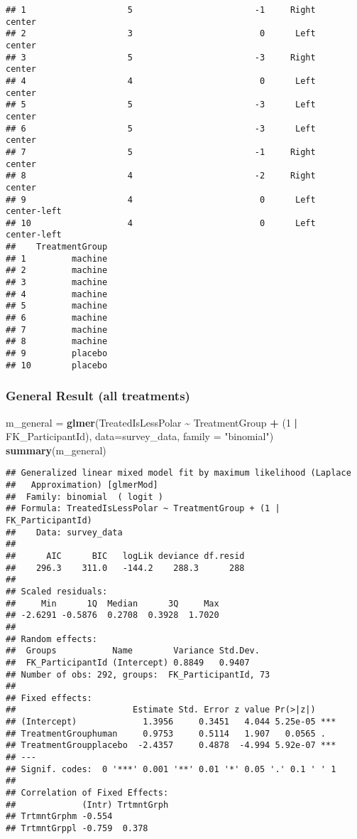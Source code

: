 \documentclass[
]{article}
\newenvironment{Shaded}{\begin{snugshade}}{\end{snugshade}}
\newcommand{\AttributeTok}[1]{\textcolor[rgb]{0.13,0.29,0.53}{#1}}
\newcommand{\DecValTok}[1]{\textcolor[rgb]{0.00,0.00,0.81}{#1}}
\newcommand{\FunctionTok}[1]{\textcolor[rgb]{0.13,0.29,0.53}{\textbf{#1}}}
\newcommand{\NormalTok}[1]{#1}
\newcommand{\OtherTok}[1]{\textcolor[rgb]{0.56,0.35,0.01}{#1}}
\newcommand{\SpecialCharTok}[1]{\textcolor[rgb]{0.81,0.36,0.00}{\textbf{#1}}}
\newcommand{\StringTok}[1]{\textcolor[rgb]{0.31,0.60,0.02}{#1}}
\begin{document}
\begin{verbatim}
## 1                    5                        -1     Right             center
## 2                    3                         0      Left             center
## 3                    5                        -3     Right             center
## 4                    4                         0      Left             center
## 5                    5                        -3      Left             center
## 6                    5                        -3      Left             center
## 7                    5                        -1     Right             center
## 8                    4                        -2     Right             center
## 9                    4                         0      Left        center-left
## 10                   4                         0      Left        center-left
##    TreatmentGroup
## 1         machine
## 2         machine
## 3         machine
## 4         machine
## 5         machine
## 6         machine
## 7         machine
## 8         machine
## 9         placebo
## 10        placebo
\end{verbatim}

\subsubsection{General Result (all
treatments)}\label{general-result-all-treatments}

\begin{Shaded}
\begin{Highlighting}[]
\NormalTok{m\_general }\OtherTok{=} \FunctionTok{glmer}\NormalTok{(TreatedIsLessPolar }\SpecialCharTok{\textasciitilde{}}\NormalTok{ TreatmentGroup }\SpecialCharTok{+}\NormalTok{ (}\DecValTok{1} \SpecialCharTok{|}\NormalTok{ FK\_ParticipantId),}
              \AttributeTok{data=}\NormalTok{survey\_data, }\AttributeTok{family =} \StringTok{"binomial"}\NormalTok{)}
\FunctionTok{summary}\NormalTok{(m\_general)}
\end{Highlighting}
\end{Shaded}

\begin{verbatim}
## Generalized linear mixed model fit by maximum likelihood (Laplace
##   Approximation) [glmerMod]
##  Family: binomial  ( logit )
## Formula: TreatedIsLessPolar ~ TreatmentGroup + (1 | FK_ParticipantId)
##    Data: survey_data
## 
##      AIC      BIC   logLik deviance df.resid 
##    296.3    311.0   -144.2    288.3      288 
## 
## Scaled residuals: 
##     Min      1Q  Median      3Q     Max 
## -2.6291 -0.5876  0.2708  0.3928  1.7020 
## 
## Random effects:
##  Groups           Name        Variance Std.Dev.
##  FK_ParticipantId (Intercept) 0.8849   0.9407  
## Number of obs: 292, groups:  FK_ParticipantId, 73
## 
## Fixed effects:
##                       Estimate Std. Error z value Pr(>|z|)    
## (Intercept)             1.3956     0.3451   4.044 5.25e-05 ***
## TreatmentGrouphuman     0.9753     0.5114   1.907   0.0565 .  
## TreatmentGroupplacebo  -2.4357     0.4878  -4.994 5.92e-07 ***
## ---
## Signif. codes:  0 '***' 0.001 '**' 0.01 '*' 0.05 '.' 0.1 ' ' 1
## 
## Correlation of Fixed Effects:
##             (Intr) TrtmntGrph
## TrtmntGrphm -0.554           
## TrtmntGrppl -0.759  0.378
\end{verbatim}
\end{document}
